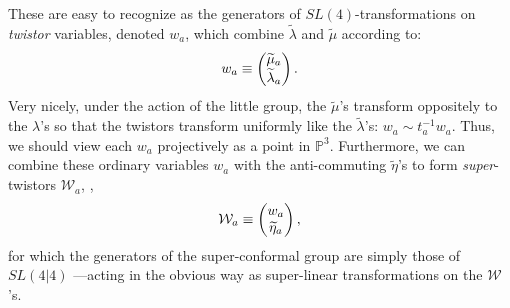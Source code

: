 \documentclass[12pt,hyperref,compress]{JHEP3}
\newcommand{\eq}[1]{\begin{equation}#1\end{equation}}
\begin{document}
{These are easy to recognize as the generators of $SL(4)$-transformations on {\it twistor} variables, denoted $w_a$, which combine $\widetilde\lambda$ and $\widetilde\mu$ according to:
\vspace{-.2cm}\eq{w_a\equiv\left(\begin{array}{@{}c@{}}\widetilde\mu_a\\\widetilde\lambda_a\end{array}\right).\vspace{-.2cm}}
Very nicely, under the action of the little group, the $\widetilde\mu$'s transform oppositely to the $\lambda$'s so that the twistors transform uniformly like the $\widetilde\lambda$'s: $w_a\sim t_a^{-1} w_a$. Thus, we should view each $w_a$ projectively as a point in $\mathbb{P}^3$. Furthermore, we can combine these ordinary variables $w_a$ with the anti-commuting $\widetilde\eta$'s to form {\it super}-twistors $\mathcal{W}_a$, \cite{Ferber:1977qx},
\vspace{-.2cm}\eq{\mathcal{W}_a\equiv\left(\begin{array}{@{}c@{}}w_a\\\widetilde\eta_a\end{array}\right),\vspace{-.2cm}}
for which the generators of the super-conformal group are simply those of $SL(4|4)$ ---acting in the obvious way as super-linear transformations on the $\mathcal{W}$'s.

}
\end{document}
